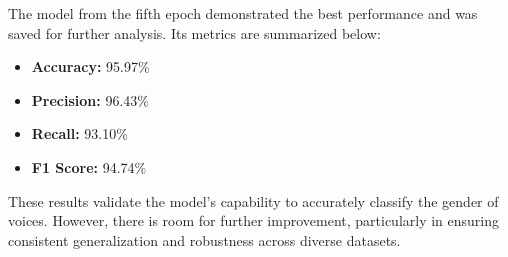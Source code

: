 The model from the fifth epoch demonstrated the best performance and was saved for further analysis. Its metrics are summarized below:
\begin{itemize}
    \item \textbf{Accuracy:} 95.97\%
    \item \textbf{Precision:} 96.43\%
    \item \textbf{Recall:} 93.10\%
    \item \textbf{F1 Score:} 94.74\%
\end{itemize}

These results validate the model's capability to accurately classify the gender of voices. However, there is room for further improvement, particularly in ensuring consistent generalization and robustness across diverse datasets.
